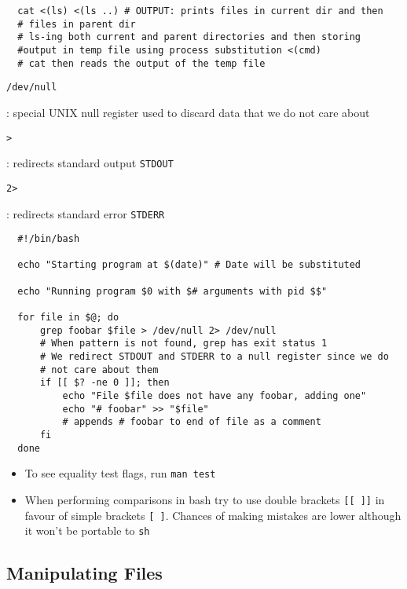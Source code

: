 \documentclass[letterpaper,12pt]{article}
\newcommand*{\lstitem}[1]{
  \setbox0\hbox{\lstinline{#1}}
  \item[\usebox0]
}
\begin{document}
\begin{lstlisting}
  cat <(ls) <(ls ..) # OUTPUT: prints files in current dir and then
  # files in parent dir
  # ls-ing both current and parent directories and then storing
  #output in temp file using process substitution <(cmd)
  # cat then reads the output of the temp file
\end{lstlisting}

\begin{description}
 \lstitem{/dev/null}: special UNIX null register used to discard data that we do not care about
 \lstitem{>}: redirects standard output \lstinline{STDOUT}
 \lstitem{2>}: redirects standard error \lstinline{STDERR}
\end{description}

\begin{lstlisting}
  #!/bin/bash

  echo "Starting program at $(date)" # Date will be substituted

  echo "Running program $0 with $# arguments with pid $$"

  for file in $@; do
      grep foobar $file > /dev/null 2> /dev/null
      # When pattern is not found, grep has exit status 1
      # We redirect STDOUT and STDERR to a null register since we do
      # not care about them
      if [[ $? -ne 0 ]]; then
          echo "File $file does not have any foobar, adding one"
          echo "# foobar" >> "$file"
          # appends # foobar to end of file as a comment
      fi
  done
\end{lstlisting}

\begin{itemize}
 \item To see equality test flags, run \lstinline{man test}
 \item When performing comparisons in bash try to use double brackets \lstinline{[[ ]]} in favour of simple brackets \lstinline{[ ]}. Chances of making mistakes are lower although it won’t be portable to \lstinline{sh}
\end{itemize}

\subsection{Manipulating Files}
\end{document}

